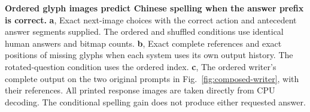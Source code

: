 \textbf{Ordered glyph images predict Chinese spelling when the answer prefix is correct.}
\textbf{a}, Exact next-image choices with the correct action and antecedent answer segments supplied. The ordered and shuffled conditions use identical human answers and bitmap counts. \textbf{b}, Exact complete references and exact positions of missing glyphs when each system uses its own output history. The rotated-question condition uses the ordered index. \textbf{c}, The ordered writer's complete output on the two original prompts in Fig.~\ref{fig:composed-writer}, with their references. All printed response images are taken directly from CPU decoding. The conditional spelling gain does not produce either requested answer.
